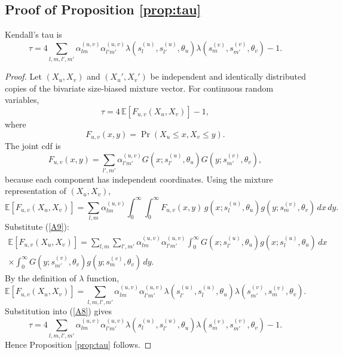 \documentclass[eng]{csam}
\begin{document}
{\subsection*{Proof of Proposition \ref{prop:tau}}

Kendall's tau is
\begin{equation*}
\tau = 4 \sum_{l,m,l',m'} \alpha^{(u,v)}_{lm} \alpha^{(u,v)}_{l'm'} \lambda(s_l^{(u)},s_{l'}^{(u)},\theta_u) \lambda(s_m^{(v)},s_{m'}^{(v)},\theta_v) -1.
\end{equation*}

\begin{proof}
Let $(X_u,X_v)$ and $(X_u',X_v')$ be independent and identically distributed copies of the bivariate size-biased mixture vector. For continuous random variables,
\begin{equation}\label{A8}
\tau = 4\,\mathbb E\left[ F_{u,v}(X_u,X_v) \right]-1,
\end{equation}
where
\begin{equation*}
F_{u,v}(x,y) = \Pr(X_u\le x,X_v\le y).
\end{equation*}
The joint cdf is
\begin{equation}\label{A9}
F_{u,v}(x,y) = \sum_{l',m'} \alpha_{l'm'}^{(u,v)} G(x;s_{l'}^{(u)},\theta_u) G(y;s_{m'}^{(v)},\theta_v),
\end{equation}
because each component has independent coordinates. Using the mixture representation of $(X_u,X_v)$,
\begin{equation*}
\mathbb E[F_{u,v}(X_u,X_v)] = \sum_{l,m}\alpha_{lm}^{(u,v)} \int_0^\infty\int_0^\infty F_{u,v}(x,y)\, g(x;s_l^{(u)},\theta_u) g(y;s_m^{(v)},\theta_v)\,dx\,dy.
\end{equation*}
Substitute (\ref{A9}):
\begin{multline*}
\mathbb E[F_{u,v}(X_u,X_v)] = \sum_{l,m}\sum_{l',m'} \alpha_{lm}^{(u,v)}\alpha_{l'm'}^{(u,v)} \int_0^\infty G(x;s_{l'}^{(u)},\theta_u) g(x;s_l^{(u)},\theta_u)\,dx\\
\times \int_0^\infty G(y;s_{m'}^{(v)},\theta_v) g(y;s_m^{(v)},\theta_v)\,dy.
\end{multline*}
By the definition of $\lambda$ function,
\begin{equation*}
\mathbb E[F_{u,v}(X_u,X_v)] =\sum_{l,m,l',m'} \alpha_{lm}^{(u,v)}\alpha_{l'm'}^{(u,v)} \lambda(s_{l'}^{(u)},s_l^{(u)},\theta_u) \lambda(s_{m'}^{(v)},s_m^{(v)},\theta_v).
\end{equation*}
Substitution into (\ref{A8}) gives
\begin{equation*}
\tau = 4 \sum_{l,m,l',m'} \alpha_{lm}^{(u,v)}\alpha_{l'm'}^{(u,v)} \lambda(s_l^{(u)},s_{l'}^{(u)},\theta_u) \lambda(s_m^{(v)},s_{m'}^{(v)},\theta_v) -1.
\end{equation*}
Hence Proposition \ref{prop:tau} follows.
\end{proof}


}
\end{document}
